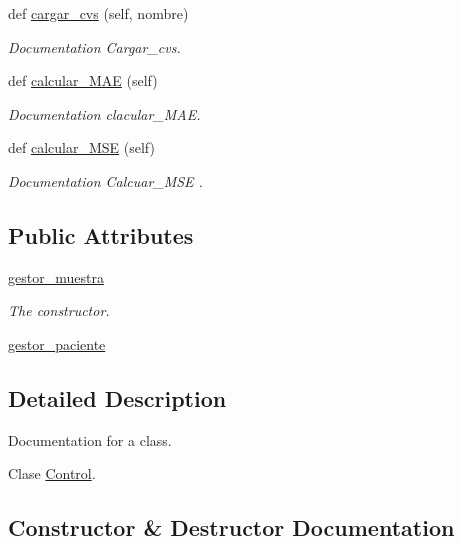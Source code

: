 \begin{DoxyCompactItemize}
def \mbox{\hyperlink{class_control_1_1_control_af797736917f8b84301deec8568ee1fa9}{cargar\+\_\+cvs}} (self, nombre)
\begin{DoxyCompactList}\small\item\em Documentation Cargar\+\_\+cvs. \end{DoxyCompactList}\item 
def \mbox{\hyperlink{class_control_1_1_control_a01b94321309bbd777b1d147559ba8163}{calcular\+\_\+\+M\+AE}} (self)
\begin{DoxyCompactList}\small\item\em Documentation clacular\+\_\+\+M\+AE. \end{DoxyCompactList}\item 
def \mbox{\hyperlink{class_control_1_1_control_ae634564c3406e0fe8fe8cc1e53f8a924}{calcular\+\_\+\+M\+SE}} (self)
\begin{DoxyCompactList}\small\item\em Documentation Calcuar\+\_\+\+M\+SE . \end{DoxyCompactList}\end{DoxyCompactItemize}
\subsection*{Public Attributes}
\begin{DoxyCompactItemize}
\item 
\mbox{\hyperlink{class_control_1_1_control_a3f36ff12e9a8426c59576f5273feb27f}{gestor\+\_\+muestra}}
\begin{DoxyCompactList}\small\item\em The constructor. \end{DoxyCompactList}\item 
\mbox{\hyperlink{class_control_1_1_control_a0ba7f844d0615b75a51687f61ca0e082}{gestor\+\_\+paciente}}
\end{DoxyCompactItemize}


\subsection{Detailed Description}
Documentation for a class. 

Clase \mbox{\hyperlink{class_control_1_1_control}{Control}}. 

\subsection{Constructor \& Destructor Documentation}
\mbox{\label{class_control_1_1_control_acbf9737a141c25fda2909c24f68cb75e}} 

